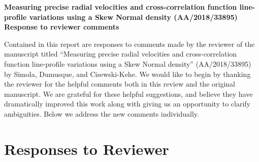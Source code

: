 \documentclass[11pt]{article}   	%
\begin{document}
\begin{center}
{\bf Measuring precise radial velocities and cross-correlation function line-profile variations using a Skew Normal density (AA/2018/33895)\\
Response to reviewer comments}
\end{center}

Contained in this report are responses to comments made by the reviewer of the manuscript titled ``Measuring precise radial velocities and cross-correlation function line-profile variations using a Skew Normal density'' (AA/2018/33895) by Simola, Dumusque, and Cisewski-Kehe.  We would like to begin by thanking the reviewer for the helpful comments both in this review and the original manuscript.  We are grateful for these helpful suggestions, and believe they have dramatically improved this work along with giving us an opportunity to clarify ambiguities.  Below we address the new comments individually.  


\section{Responses to Reviewer}
\end{document}

